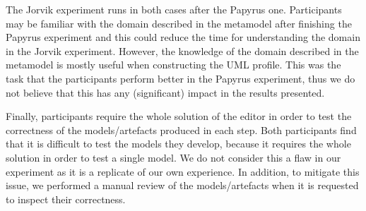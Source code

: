The Jorvik experiment runs in both cases after the Papyrus one. 
Participants may be familiar with the domain described in the metamodel after finishing the Papyrus experiment and this could reduce the time for understanding the domain in the Jorvik experiment. 
However, the knowledge of the domain described in the metamodel is mostly useful when constructing the UML profile. 
This was the task that the participants perform better in the Papyrus experiment, thus we do not believe that this has any (significant) impact in the results presented.

Finally, participants require the whole solution of the editor in order to test the correctness of the models/artefacts produced in each step. 
Both participants find that it is difficult to test the models they develop, because it requires the whole solution in order to test a single model. 
We do not consider this a flaw in our experiment as it is a replicate of our own experience.
In addition, to mitigate this issue, we performed a manual review of the models/artefacts when it is requested to inspect their correctness.
